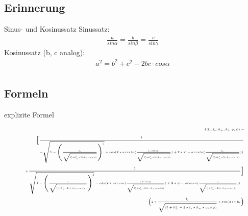\documentclass[compress]{beamer}
\begin{document}
\subsection{Erinnerung}
\begin{frame}{Sinus- und Kosinussatz}
	Sinussatz:
	\begin{align*}
	\frac{a}{sin \alpha} = \frac{b}{sin \beta} = \frac{c}{sin\gamma}
	\end{align*}
	Kosinussatz (b, c analog):
	\begin{align*}
	a^2 = b^2 + c^2 - 2bc\cdot cos\alpha\\
	\end{align*}
\end{frame}

\subsection{Formeln}
\begin{frame}{explizite Formel}
	$$ \mbox{ \fontsize{4pt}{2} $
	\begin{split}
	b (l_r, l_e, h_m, h_b, \phi, \psi) =\\ 
	\bigg[\frac{1}{- \sqrt{1 - \left(\frac{l_r}{\sqrt{l_e^2 + h_m^2 - 2l_eh_m\cdot cos(\phi)}}\right)^2} + cos(2 * arcsin(\frac{l_e * sin(\phi)}{\sqrt{l_e^2 + h_m^2 - 2l_eh_m\cdot cos(\phi)}}) + 2 * \psi - arcsin(\frac{l_r}{\sqrt{l_e^2 + h_m^2 - 2l_eh_m\cdot cos(\phi)}}))}\\ 
	+ \frac{1}{\sqrt{1- \left(\frac{l_r}{\sqrt{l_e ^2 + h_m^2 - 2*l_e*h_m * cos(\phi)}}\right)^2} - cos(2*arcsin(\frac{l_e * sin(\phi)}{\sqrt{l_e ^2 + h_m^2 - 2*l_e*h_m * cos(\phi)}}) + 2* \psi - arcsin(\frac{l_r}{\sqrt{l_e ^2 + h_m^2 - 2*l_e*h_m * cos(\phi)}}))}\bigg]\\
	\cdot\bigg(2 * \frac{l_r}{\sqrt{l_e ^2 + h_m^2 - 2*l_e*h_m * cos(\phi)}} * sin(\phi) * h_b\bigg)
	\end{split} $}$$
\end{frame}
\end{document}
